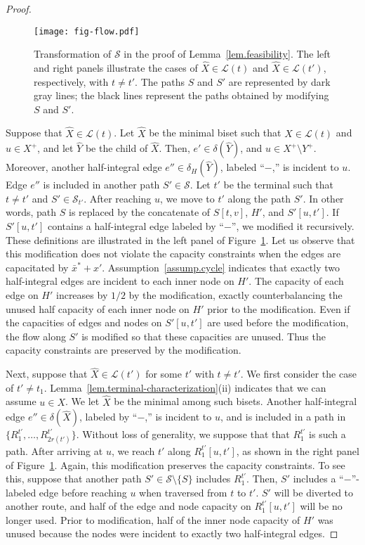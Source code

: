 \documentclass{article}
\newcommand{\Lfam}{\mathcal{L}}
\newcommand{\Sfam}{\mathcal{S}}
\begin{document}
\begin{proof}
\begin{figure}
\centering
\texttt{[image: fig-flow.pdf]}
\caption{Transformation of $\Sfam$ in the proof of Lemma~\ref{lem.feasibility}. The left and right
panels illustrate the cases of $\hat{X}\in \Lfam(t)$ and $\hat{X} \in
\Lfam(t')$, respectively, with $t \neq t'$. The paths $S$ and $S'$ are represented by dark gray lines;
the black lines represent the paths obtained by modifying $S$ and $S'$.}
\label{fig.flow-transformation}
\end{figure}


Suppose that $\hat{X} \in \Lfam(t)$. 
Let $\hat{X}$ be the minimal biset such that $\hat{X} \in \Lfam(t)$ and $u \in X^+$, and
let $\hat{Y}$ be the child of $\hat{X}$.
Then, $e' \in \delta(\hat{Y})$, and $u \in X^+ \setminus Y^+$.
Moreover, another half-integral edge $e'' \in \delta_H(\hat{Y})$, labeled ``$-$,'' is incident to
$u$.
Edge $e''$ is included in another path $S' \in \Sfam$.
Let $t'$ be the terminal such that $t\neq t'$ and $S' \in \Sfam_{t'}$.
After reaching $u$, we move to $t'$ along the path $S'$.
In other words,
path $S$ is replaced by the concatenate of $S[t,v]$,
$H'$, and $S'[u,t']$.
If $S'[u,t']$ contains a half-integral edge labeled by ``$-$'', we modified it recursively.
These definitions are illustrated in the left panel of Figure~\ref{fig.flow-transformation}.
Let us observe that this modification does not violate 
the capacity constraints when the edges are capacitated by $\bar{x}^* + x'$.
 Assumption~\ref{assump.cycle}
 indicates that
 exactly two half-integral edges are incident to each inner node on $H'$.
 The capacity of each edge on $H'$ increases by $1/2$ by the modification,
 exactly counterbalancing the unused half capacity
of each inner node on $H'$ prior to the modification.
 Even if the capacities of edges and nodes on
 $S'[u,t']$ are used before the modification,
 the flow along $S'$ is modified so that these capacities are unused.
 Thus the capacity constraints are preserved by the
 modification.

 Next, suppose that $\hat{X} \in \Lfam(t')$ for some $t'$ with $t\neq t'$.
 We first consider the case of $t' \neq t_1$.
 Lemma~\ref{lem.terminal-characterization}(ii) indicates that
 we can assume $u \in X$.
 We let $\hat{X}$ be the minimal among such bisets.
Another half-integral edge $e'' \in \delta(\hat{X})$, labeled by ``$-$,'' is incident to $u$,
and is included in a path in $\{R_1^{t'},\ldots,  R_{2r(t')}^{t'}\}$.
Without loss of generality, we suppose that that $R_1^{t'}$ is such a path.
After arriving at $u$, we reach $t'$ along $R_1^{t'}[u,t']$, 
as shown in the right panel of Figure~\ref{fig.flow-transformation}.
Again, this modification preserves the capacity constraints. To see this,
suppose that another path $S' \in \Sfam \setminus \{S\}$ includes $R_1^{t'}$.
Then,
$S'$ includes a ``$-$''-labeled edge before reaching $u$ when traversed from $t$ to $t'$.
$S'$ will be diverted to another route, and 
half of the edge and node capacity on $R_1^{t'}[u,t']$ will be no longer used.
Prior to modification,
half of the inner node capacity of $H'$ was unused because
the nodes were incident to exactly two half-integral edges.


\end{proof}
\end{document}
